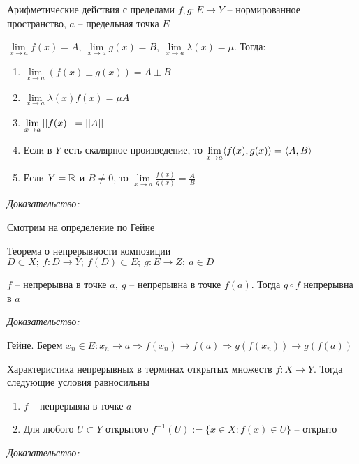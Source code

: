 \documentclass[12pt]{article}
\begin{document}
\begin{theo}{Арифметические действия с пределами}
    $f, g : E \to Y$ -- нормированное пространство, $a$ -- предельная точка $E$
    
    $\lim\limits_{x \to a} f(x) = A,\ \lim\limits_{x \to a} g(x) = B,\ \lim\limits_{x \to a} \lambda(x) = \mu$. Тогда:

    \begin{enumerate}
        \item $\lim\limits_{x \to a} (f(x) \pm g(x)) = A \pm B$
        \item $\lim\limits_{x \to a} \lambda(x) f(x) = \mu A$
        \item $\lim\limits_{x \to a} || f(x) || = || A ||$
        \item Если в $Y$ есть скалярное произведение, то $\lim\limits_{x \to a} \langle f(x), g(x) \rangle = \langle A, B \rangle$
        \item Если $Y = \mathbb R$ и $B \neq 0$, то $\lim\limits_{x \to a} \frac{f(x)}{g(x)} = \frac{A}{B}$
    \end{enumerate}
\end{theo}

\textit{Доказательство:}

Смотрим на определение по Гейне

\begin{theo}{Теорема о непрерывности композиции}
    $D \subset X;\ f : D \to Y;\ f(D) \subset E;\ g : E \to Z;\ a \in D$

    $f$ -- непрерывна в точке $a,\ g$ -- непрерывна в точке $f(a)$. Тогда $g \circ f$ непрерывна в $a$
\end{theo}

\textit{Доказательство:}

Гейне. Берем $x_n \in E : x_n \to a \Rightarrow f(x_n) \to f(a) \Rightarrow g(f(x_n)) \to g(f(a))$

\begin{theo}{Характеристика непрерывных в терминах открытых множеств}
    $f : X \to Y$. Тогда следующие условия равносильны

    \begin{enumerate}
        \item $f$ -- непрерывна в точке $a$
        \item Для любого $U \subset Y$ открытого $f^{-1}(U) := \{x \in X : f(x) \in U\}$ -- открыто 
    \end{enumerate}
\end{theo}

\textit{Доказательство:}
\end{document}
